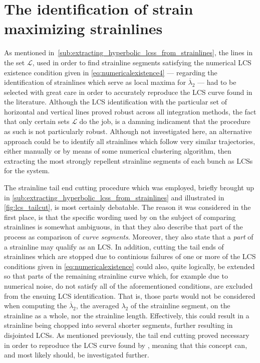 \section{The identification of strain maximizing strainlines}
\label{sec:the_identification_of_strain_maximizing_strainlines}

As mentioned in~\cref{sub:extracting_hyperbolic_lcss_from_strainlines},
the lines in the set $\mathcal{L}$, used in order to find strainline segments
satisfying the numerical LCS existence condition given in
\cref{eq:numericalexistence4} --- regarding the identification of strainlines
which serve as local maxima for $\overline{\lambda}_{2}$ --- had to be selected
with great care in order to accurately reproduce the LCS curve found in the
literature. Although the LCS identification with the particular set of
horizontal and vertical lines proved robust across all integration methods, the
fact that only certain sets $\mathcal{L}$ do the job, is a damning indicament
that the procedure as such is not particularly robust. Although not investigated
here, an alternative approach could be to identify all strainlines which follow
very similar trajectories, either manually or by means of some numerical
clustering algorithm, then extracting the most strongly repellent strainline
segments of each bunch as LCSs for the system.

The strainline tail end cutting procedure which was employed, briefly brought
up in
\cref{sub:extracting_hyperbolic_lcss_from_strainlines} and illustrated in
\cref{fig:lcs_tailcut}, is most certainly debatable. The reason it was
considered in the first place, is that the specific wording used by
\textcite{farazmand2012computing} on the subject of comparing strainlines is
somewhat ambiguous, in that they also describe that part of the process as
comparison of \emph{curve segments}. Moreover, they also state that a
\emph{part} of a strainline may qualify as an LCS. In addition, cutting the
tail ends of strainlines which are stopped due to continious failures of one
or more of the LCS conditions given in
\cref{eq:numericalexistence} could also, quite logically, be extended so that
parts of the remaining strainline curve which, for example due to numerical
noise, do not satisfy all of the aforementioned conditions, are excluded from
the ensuing LCS identification. That is, those parts would not be considered
when computing the $\overline{\lambda}_{2}$, the averaged $\lambda_{2}$ of
the strainline segment, on the strainline as a whole, nor
the strainline length. Effectively, this could result in a strainline being
chopped into several shorter segments, further resulting in
disjointed LCSs. As mentioned previously, the tail end cutting proved necessary
in order to reproduce the LCS curve found by \textcite{farazmand2012computing},
meaning that this concept can, and most likely should, be investigated further.

